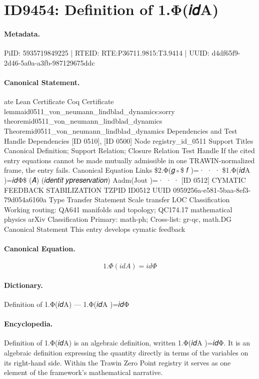 \section*{ID9454: Definition of 1.Φ(𝑖𝑑A)}
\paragraph{Metadata.}
PiID: 5935719849225 | RTEID: RTE:P36711.9815:T3.9414 | UUID: d4df65f9-2d46-5a0a-a3fb-987129675ddc

\paragraph{Canonical Statement.}
ate Lean Certificate Coq Certificate lemmaid0511\_von\_neumann\_lindblad\_dynamics:sorry theoremid0511\_von\_neumann\_lindblad\_dynamics Theoremid0511\_von\_neumann\_lindblad\_dynamics Dependencies and Test Handle Dependencies [ID 0510], [ID 0500] Node registry\_id\_0511 Support Titles Canonical Definition; Support Relation; Closure Relation Test Handle If the cited entry equations cannot be made mutually admissible in one TRAWIN-normalized frame, the entry fails. Canonical Equation Links \$2.Φ(𝑔◦\$ 𝑓 )=· · · \$1.Φ(𝑖𝑑A )=𝑖𝑑Φ\$ (𝐴) (𝑖𝑑𝑒𝑛𝑡𝑖𝑡 𝑦𝑝𝑟𝑒𝑠𝑒𝑟𝑣𝑎𝑡𝑖𝑜𝑛) Aadm(Jout )=· · · [ID 0512] CYMATIC FEEDBACK STABILIZATION TZPID ID0512 UUID 0959256a-e581-5baa-8ef3-79d054a6160a Type Transfer Statement Scale transfer LOC Classification Working routing: QA641 manifolds and topology; QC174.17 mathematical physics arXiv Classification Primary: math-ph; Cross-list: gr-qc, math.DG Canonical Statement This entry develops cymatic feedback

\paragraph{Canonical Equation.}
\[
1.Φ(𝑖𝑑A )=𝑖𝑑Φ
\]

\paragraph{Dictionary.}
Definition of 1.Φ(𝑖𝑑A) — 1.Φ(𝑖𝑑A )=𝑖𝑑Φ

\paragraph{Encyclopedia.}
Definition of 1.Φ(𝑖𝑑A) is an algebraic definition, written 1.Φ(𝑖𝑑A )=𝑖𝑑Φ. It is an algebraic definition expressing the quantity directly in terms of the variables on its right-hand side. Within the Trawin Zero Point registry it serves as one element of the framework's mathematical narrative.
